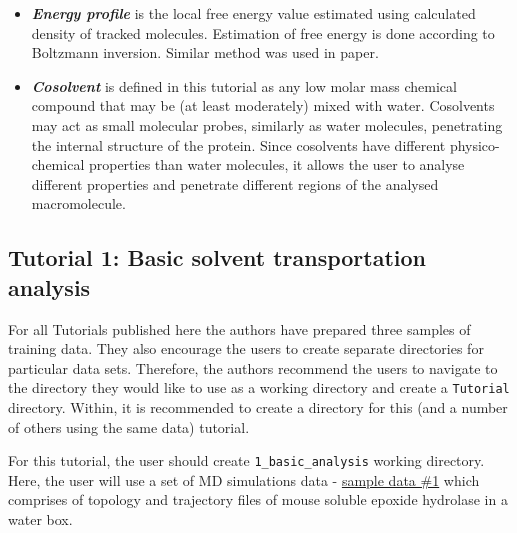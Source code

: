 \documentclass[9pt,tutorial]{livecoms}
\begin{document}
\begin{itemize}
\item \textbf{\textit{Energy profile}} is the local free energy value estimated using calculated density of tracked molecules. Estimation of free energy is done according to Boltzmann inversion. Similar method was used in \cite{Rao2017} paper.
\item \textbf{\textit{Cosolvent}} is defined in this tutorial as any low molar mass chemical compound that may be (at least moderately) mixed with water. Cosolvents may act as small molecular probes, similarly as water molecules, penetrating the internal structure of the protein. Since cosolvents have different physico-chemical properties than water molecules, it allows the user to analyse different properties and penetrate different regions of the analysed macromolecule.
\end{itemize}

\subsection{Tutorial 1: Basic solvent transportation analysis}
For all Tutorials published here the authors have prepared three samples of training data. They also encourage the users to create 
separate directories for particular data sets. Therefore, the authors recommend the users to navigate to the directory they would like to use as a working directory and create a \texttt{Tutorial} directory. Within, it is recommended to create a directory for this (and a number of others using the same data) tutorial. 

For this tutorial, the user should create \texttt{1\_basic\_analysis} working directory. Here, the user will use a set of MD simulations data
- \href{http://www.aquaduct.pl/user-guide/}{sample data \#1} which comprises of topology and trajectory files of mouse soluble epoxide hydrolase in a water box.
\end{document}
